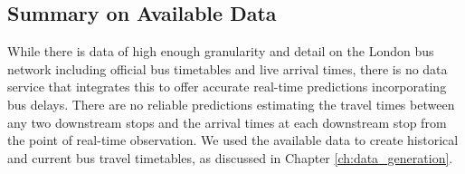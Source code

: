 \subsection{Summary on Available Data}
\par While there is data of high enough granularity and detail on the London bus network including official bus timetables and live arrival times, there is no data service that integrates this to offer accurate real-time predictions incorporating bus delays. There are no reliable predictions estimating the travel times between any two downstream stops and the arrival times at each downstream stop from the point of real-time observation. We used the available data to create historical and current bus travel timetables, as discussed in Chapter \ref{ch:data_generation}.
